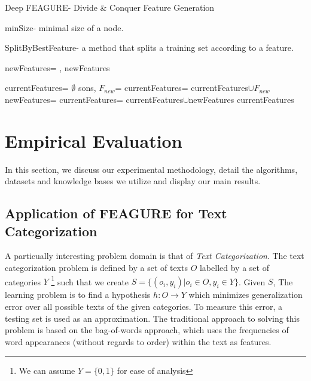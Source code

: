 \documentclass[twoside,11pt]{article}
\theoremstyle{definition}
\begin{document}
\begin{algorithm}[H]
	\caption{Deep FEAGURE- Divide \& Conquer Feature Generation}
	\label{code-tree-thing}
	\small
		minSize- minimal size of a node.

        SplitByBestFeature- a method that splits a training set according to a feature.
        
		\begin{algorithmic}
                    \State
                    \Return 
                \EndIf
                \State newFeatures=
                \State \Return {}, newFeatures
			\EndFunction

            			
			\State 
                \State currentFeatures= $\emptyset$
                \State sons, $F_{new}$=
                \State currentFeatures= currentFeatures$\cup F_{new}$
                    \State newFeatures=
                    \State currentFeatures= currentFeatures$\cup$newFeatures
                \EndFor
                \State \Return currentFeatures
			\EndFunction
		\end{algorithmic}
	\end{algorithm}


\section{Empirical Evaluation}
In this section, we discuss our experimental methodology, detail the algorithms, datasets and knowledge bases we utilize and display our main results.

\subsection{Application of FEAGURE for Text Categorization} \label{text-feagure}

A particually interesting problem domain is that of \emph{Text Categorization}.
The text categorization problem is defined by a set of texts $O$ labelled by a set of categories $Y$ \footnote{We can assume $Y=\{0,1\}$ for ease of analysis}
such that we create $S=\{(o_i,y_i)|o_i\in O, y_i\in Y\}$. Given $S$, The learning problem is to find a hypothesis $h:O\rightarrow Y$ which minimizes generalization error over all possible texts of the given categories. To measure this error, a testing set is used as an approximation.
The traditional approach to solving this problem is based on the bag-of-words \cite{Wu:1981:CST:1013228.511759,salton1983introduction} approach, which uses the frequencies of word appearances (without regards to order) within the text as features. 
\end{document}
